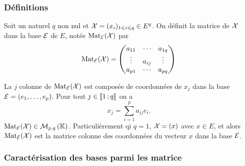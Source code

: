 \subsubsection{Définitions}

\begin{defdef}
  Soit un naturel \(q\) non nul et \(\mathcal{X}=(x_i)_{1 \leqslant i \leqslant q}
  \in E^q\). On définit la matrice de \(\mathcal{X}\) dans la base \(\mathcal{E}\) de \(E\),
  notée \(\mathrm{Mat}_{\mathcal{E}}(\mathcal{X})\) par
  \begin{equation}
    \mathrm{Mat}_{\mathcal{E}}(\mathcal{X}) =
    \begin{pmatrix}
      a_{11} & \cdots & a_{1q} \\
      \vdots & a_{ij} & \vdots \\
      a_{p1} & \cdots & a_{pq}
    \end{pmatrix}
  \end{equation}

  La \(j\)\ieme{} colonne de \(\mathrm{Mat}_{\mathcal{E}}(\mathcal{X})\) est composée de coordonnées
  de \(x_j\) dans la base \(\mathcal{E}=(e_1, \ldots, e_p)\). Pour tout \(j \in
  \mathopen{\llbracket}1\mathclose{}\mathpunct{};q\mathclose{\rrbracket}\) on a
  \begin{equation}
    x_j = \sum_{i=1}^p a_{ij}e_i.
  \end{equation}
  \(\mathrm{Mat}_{\mathcal{E}}(\mathcal{X}) \in \mathcal{M}_{p,q}\left(\mathbb{K}\right)\). Particulièrement qi \(q=1\),
  \(\mathcal{X}=(x)\) avec \(x \in E\), et alors \(\mathrm{Mat}_{\mathcal{E}}(\mathcal{X})\) est la matrice
  colonne des coordonnées du vecteur \(x\) dans la base \(\mathcal{E}\).
\end{defdef}

\subsubsection{Caractérisation des bases parmi les matrice}

